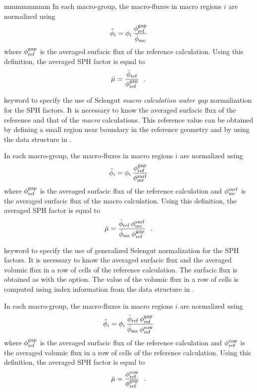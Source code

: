\begin{ListeDeDescription}{mmmmmmmm}
\noindent In each macro-group, the macro-fluxes in macro regions $i$ are normalized using
$$
\tilde\phi_i=\phi_i\,{\phi_{\rm ref}^{\rm gap}\over \bar\phi_{\rm mc}}
$$
\noindent where $\phi_{\rm ref}^{\rm gap}$ is the averaged surfacic flux of the reference calculation. Using this definition, the averaged SPH factor is equal to
$$
\bar\mu={\bar\phi_{\rm ref}\over \phi_{\rm ref}^{\rm gap} } \ \ .
$$

\item[\moc{SELE\_MWG}] keyword to specify the use of Selengut {\sl macro calculation water gap} normalization for the SPH factors.\cite{Chambon2014} It is necessary to know the averaged surfacic flux of the reference and that of the {\sl macro} calculations. This reference value can be obtained by defining
a small region near boundary in the reference geometry and by using the  data structure in .

\noindent In each macro-group, the macro-fluxes in macro regions $i$ are normalized using
$$
\tilde\phi_i=\phi_i\,{\phi_{\rm ref}^{\rm gap}\over \phi^{\rm surf}_{\rm mc}}
$$
\noindent where $\phi_{\rm ref}^{\rm gap}$ is the averaged surfacic flux of the reference calculation and $\phi^{\rm surf}_{\rm mc}$ is the averaged surfacic flux of the macro calculation. Using this definition, the averaged SPH factor is equal to
$$
\bar\mu={\bar\phi_{\rm ref} \,\phi^{\rm surf}_{\rm mc}\over \bar\phi_{\rm mc} \,\phi_{\rm ref}^{\rm gap} } \ \ .
$$

\item[\moc{SELE\_EDF}] keyword to specify the use of generalized Selengut normalization for the SPH factors.\cite{sphedf} It is necessary to know the averaged surfacic flux and the
averaged volumic flux in a row of cells of the reference calculation. The surfacic flux is obtained as with the  option. The  value of the volumic flux in a row of
cells is computed using index information from the  data structure in .

\noindent In each macro-group, the macro-fluxes in macro regions $i$ are normalized using
$$
\tilde\phi_i=\phi_i\,{\bar\phi_{\rm ref} \, \phi_{\rm ref}^{\rm gap}\over \bar\phi_{\rm mc} \, \phi_{\rm ref}^{\rm row} }
$$
\noindent where $\phi_{\rm ref}^{\rm gap}$ is the averaged surfacic flux of the reference calculation and $\phi_{\rm ref}^{\rm row}$ is the averaged volumic flux in a row of cells of the reference calculation. Using this definition, the averaged SPH factor is equal to
$$
\bar\mu={\phi_{\rm ref}^{\rm row}\over \phi_{\rm ref}^{\rm gap} } \ \ .
$$


\end{ListeDeDescription}
